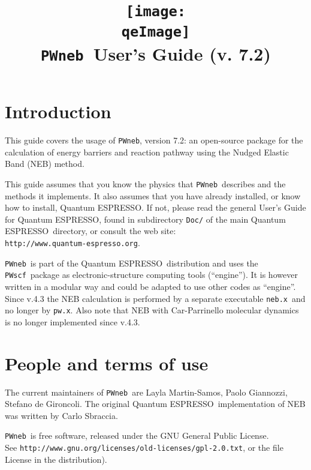 \documentclass[12pt,a4paper]{article}
\def\version{7.2}
\def\qe{{\sc Quantum ESPRESSO}}
\def\NEB{\texttt{PWneb}} %
\def\pwx{\texttt{pw.x}}
\def\nebx{\texttt{neb.x}}
\def\PWscf{\texttt{PWscf}}
\begin{document}
 
\author{}
\date{}

\def\qeImage{../../Doc/quantum_espresso}

\title{
  \texttt{[image: \\qeImage]} \\
  \Huge \NEB\ User's Guide (v. \version)
}

\maketitle

\tableofcontents

\section{Introduction}

This guide covers the usage of \NEB, version \version: 
an open-source package for the calculation of energy barriers 
and reaction pathway using the Nudged Elastic Band (NEB) method.

This guide assumes that you know the physics 
that \NEB\ describes and the methods it implements.
It also assumes  that you have already installed,
or know how to install, \qe. If not, please read
the general User's Guide for \qe, found in 
subdirectory \texttt{Doc/} of the main \qe\ directory,
or consult the web site:\\
\texttt{http://www.quantum-espresso.org}.

\NEB \ is part of the \qe \ distribution and uses the \PWscf\
package as electronic-structure computing tools (``engine''). 
It is however written in a modular way and could be adapted 
to use other codes as ``engine''. Since v.4.3 the NEB calculation
is performed by a separate executable \nebx\ and no longer by 
\pwx. Also note that NEB with Car-Parrinello molecular dynamics 
is no longer implemented since v.4.3.

\section{People and terms of use}
The current maintainers of \NEB\ are Layla Martin-Samos,
Paolo Giannozzi, Stefano de Gironcoli.
The original \qe \ implementation of NEB was written 
by Carlo Sbraccia.

\NEB\ is free software, released under the 
GNU General Public License. \\ See
\texttt{http://www.gnu.org/licenses/old-licenses/gpl-2.0.txt}, 
or the file License in the distribution).
    
\end{document}
